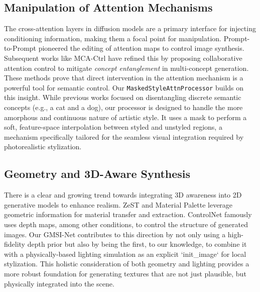 \subsection{Manipulation of Attention Mechanisms}
The cross-attention layers in diffusion models are a primary interface for injecting conditioning information, making them a focal point for manipulation. Prompt-to-Prompt \cite{hertz2022prompt} pioneered the editing of attention maps to control image synthesis. Subsequent works like MCA-Ctrl \cite{yang2024multiparty} have refined this by proposing collaborative attention control to mitigate \textit{concept entanglement} in multi-concept generation. These methods prove that direct intervention in the attention mechanism is a powerful tool for semantic control. Our \texttt{MaskedStyleAttnProcessor} builds on this insight. While previous works focused on disentangling discrete semantic concepts (e.g., a cat and a dog), our processor is designed to handle the more amorphous and continuous nature of artistic style. It uses a mask to perform a soft, feature-space interpolation between styled and unstyled regions, a mechanism specifically tailored for the seamless visual integration required by photorealistic stylization.

\subsection{Geometry and 3D-Aware Synthesis}
There is a clear and growing trend towards integrating 3D awareness into 2D generative models to enhance realism. ZeST \cite{cheng2024zest} and Material Palette \cite{lopes2024material} leverage geometric information for material transfer and extraction. ControlNet \cite{zhang2023adding} famously uses depth maps, among other conditions, to control the structure of generated images. Our GMSI-Net contributes to this direction by not only using a high-fidelity depth prior but also by being the first, to our knowledge, to combine it with a physically-based lighting simulation as an explicit `init_image` for local stylization. This holistic consideration of both geometry and lighting provides a more robust foundation for generating textures that are not just plausible, but physically integrated into the scene.
